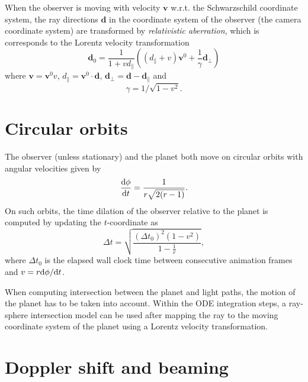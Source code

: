 \documentclass[a4paper,12pt]{article}
\def\mb{\boldsymbol}
\def\d{{\rm d}}
\begin{document}
When the observer is moving with velocity $\mb v$ w.r.t. the Schwarzschild coordinate system, the ray directions $\mb d$ in the coordinate system of the observer (the camera coordinate system) are transformed by \emph{relativistic aberration}, which is corresponds to the Lorentz velocity transformation
$$
  \mb d_0 = \frac1{1 + v d_\parallel}\left((d_\parallel + v)\mb v^0 + \frac1{\gamma} \mb d_\perp\right)
$$
where $\mb v = \mb v^0 v$, $d_\parallel = \mb v^0 \cdot \mb d$, $\mb d_\perp = \mb d - \mb d_\parallel$ and
\begin{equation}\label{lorentz-factor}
  \gamma = 1/\sqrt{1-v^2}.
\end{equation}

\section*{Circular orbits}

The observer (unless stationary) and the planet both move on circular orbits with angular velocities given by \cite{antonell}
\begin{equation}\label{circular-orbit-angular-velocity}
  \frac{\d \phi}{\d t} = \frac1{r\sqrt{2(r-1)}}.
\end{equation}
On such orbits, the time dilation of the observer relative to the planet is computed by updating the $t$-coordinate as
$$
  \Delta t = \sqrt{\frac{(\Delta t_0)^2  (1 - v^2)}{1-\frac1r}},
$$
where $\Delta t_0$ is the elapsed wall clock time between consecutive animation frames and $v = r \d \phi / \d t$. %

When computing intersection between the planet and light paths, the motion of the planet has to be taken into account. Within the ODE integration steps, a ray-sphere intersection model can be used after mapping the ray to the moving coordinate system of the planet using a Lorentz velocity transformation.

\section*{Doppler shift and beaming}
\end{document}
